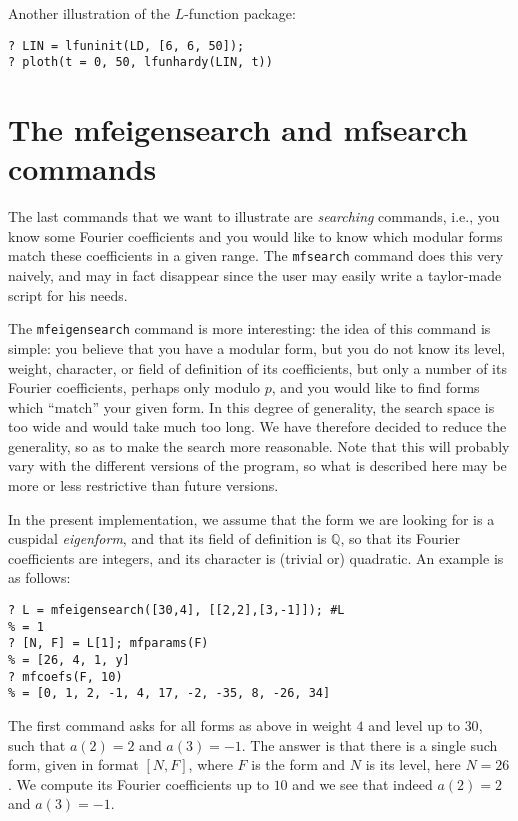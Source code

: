 \documentclass[11pt]{article}
\newcommand{\Q}{{\mathbb Q}}
\def\kbd#1{{\tt #1}}
\begin{document}
Another illustration of the $L$-function package:

\begin{verbatim}
? LIN = lfuninit(LD, [6, 6, 50]);
? ploth(t = 0, 50, lfunhardy(LIN, t))
\end{verbatim}


\medskip

\section{The mfeigensearch and mfsearch commands}

The last commands that we want to illustrate are \emph{searching} commands,
i.e., you know some Fourier coefficients and you would like to know which
modular forms match these coefficients in a given range. The
\kbd{mfsearch} command does this very naively, and may in fact disappear
since the user may easily write a taylor-made script for his needs.

The \kbd{mfeigensearch} command is more interesting: the idea
of this command is simple: you believe that you have a modular form,
but you do not know its level, weight, character, or field of definition
of its coefficients, but only a number of its Fourier coefficients, perhaps
only modulo $p$, and you would like to find forms which ``match'' your
given form. In this degree of generality, the search space is too wide
and would take much too long. We have therefore decided to reduce
the generality, so as to make the search more reasonable. Note that this
will probably vary with the different versions of the program, so what is
described here may be more or less restrictive than future versions.

In the present implementation, we assume that the form we are looking
for is a cuspidal \emph{eigenform}, and that its field of definition is $\Q$,
so that its Fourier coefficients are integers, and its character is
(trivial or) quadratic. An example is as follows:

\begin{verbatim}
? L = mfeigensearch([30,4], [[2,2],[3,-1]]); #L
% = 1
? [N, F] = L[1]; mfparams(F)
% = [26, 4, 1, y]
? mfcoefs(F, 10)
% = [0, 1, 2, -1, 4, 17, -2, -35, 8, -26, 34]
\end{verbatim}

The first command asks for all forms as above in weight $4$ and level
up to $30$, such that $a(2)=2$ and $a(3)=-1$. The answer is that there is a
single such form, given in format $[N,F]$, where $F$ is the form
and $N$ is its level, here $N = 26$. We compute its Fourier coefficients up
to $10$ and we see that indeed $a(2)=2$ and $a(3)=-1$.
\end{document}
